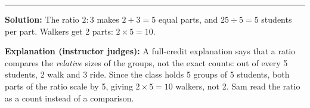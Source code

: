 \documentclass[12pt]{article}
\begin{document}
\vspace{0.3cm}\noindent\rule{\linewidth}{0.2pt}\vspace{0.3cm}


\textbf{Solution:} The ratio $2{:}3$ makes $2 + 3 = 5$ equal parts, and
$25 \div 5 = 5$ students per part. Walkers get 2 parts: $2 \times 5 = 10$.

\textbf{Explanation (instructor judges):} A full-credit explanation says that a
ratio compares the \emph{relative} sizes of the groups, not the exact counts:
out of every 5 students, 2 walk and 3 ride. Since the class holds 5 groups of 5
students, both parts of the ratio scale by 5, giving $2 \times 5 = 10$ walkers,
not 2. Sam read the ratio as a count instead of a comparison.
\end{document}
